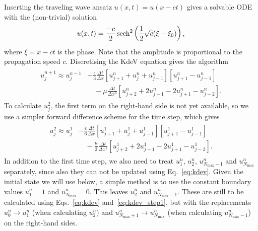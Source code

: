 \documentclass{../project}
\begin{document}
\begin{sheet}[title={Project 4: Partial differential equations (PDEs)}, number=4, due={December 20th, 10am}]
\begin{problem}[title={Solitons}, label=solitons]
  Inserting the traveling wave ansatz $u(x,t) = u(x-ct)$
  gives a solvable ODE with the (non-trivial) solution
  \begin{equation}
    u(x,t)=\frac{-c}{2} \sech^2\left( \frac{1}{2} \sqrt c (\xi - \xi_0) \right),
  \end{equation}
  where $\xi = x - ct$ is the phase.
  Note that the amplitude is proportional to the propagation speed $c$.
  Discretising the KdeV equation gives the algorithm
  \begin{align}
    \begin{split}\label{eq:kdev}
    u^{n+1}_j
    \approx
    u^{n-1}_j
      &- \frac{\epsilon}{3} \frac{\Delta t}{\Delta x} \left[ u_{j+1}^{n} + u_{j}^{n} + u_{j-1}^{n} \right]
      \left[u_{j+1}^{n} - u_{j-1}^{n}\right] \\
    &\quad- \mu \frac{\Delta t}{\Delta x^3}
      \left[ u_{j+2}^{n} + 2u_{j-1}^{n} - 2u_{j+1}^{n} - u_{j-2}^{n} \right].
    \end{split}
  \end{align}
  To calculate $u_{j}^{2}$, the first term on the right-hand side is not yet available,
  so we use a simpler forward difference scheme for the time step, which gives
  \begin{align}
    \begin{split}\label{eq:kdev_step1}
      u_{j}^{2}
    \approx
      u_{j}^{1}
      &- \frac{\epsilon}{6} \frac{\Delta t}{\Delta x} \left[ u_{j+1}^{1} + u_{j}^{1} + u_{j-1}^{1} \right]
      \left[u_{j+1}^{1} - u_{j-1}^{1}\right] \\
    &\quad- \frac\mu2 \frac{\Delta t}{\Delta x^3}
      \left[ u_{j+2}^{1} + 2u_{j-1}^{1} - 2u_{j+1}^{1} - u_{j-2}^{1} \right].
    \end{split}
  \end{align}
  In addition to the first time step, we also need to treat
  $u_{1}^n$, $u_{2}^n$, $u_{N_\text{max}-1}^n$ and $u_{N_\text{max}}^n$
  separately,
  since also they can not be updated using Eq.~\eqref{eq:kdev}.
  Given the initial state we will use below,
  a simple method is to use the constant boundary values $u_{1}^n=1$ and $u_{N_\text{max}}^n=0$.
  This leaves
  $u_{2}^n$ and $u_{N_\text{max}-1}^n$.
  These are still to be calculated using Eqs.~\eqref{eq:kdev} and~\eqref{eq:kdev_step1},
  but with the replacements
  $u_{0}^n \to u_{1}^n$ (when calculating $u_{2}^n$)
  and
  $u_{N_\text{max}+1}^n \to u_{N_\text{max}}^n$ (when calculating $u_{N_\text{max}-1}^n$)
  on the right-hand sides.


\end{problem}
\end{sheet}
\end{document}
